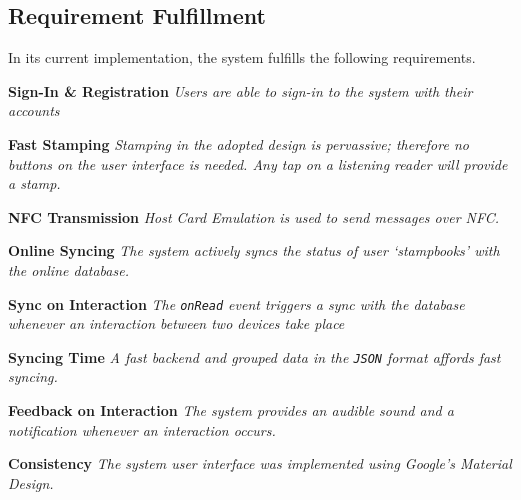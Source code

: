 \subsection{Requirement Fulfillment}
In its current implementation, the system fulfills the following requirements.
\begin{description}[leftmargin=!,labelwidth=\widthof{\bfseries Medium}]
    \item[M1] \textbf{Sign-In \& Registration} \newline
        \textit{Users are able to sign-in to the system with their accounts}
        
    \item[M2] \textbf{Fast Stamping} \newline
        \textit{Stamping in the adopted design is pervassive; therefore no buttons on the user interface is needed. Any tap on a listening reader will provide a stamp.}
    
    \item[M3] \textbf{NFC Transmission} \newline
        \textit{Host Card Emulation is used to send messages over NFC.}
        
    \item[M4] \textbf{Online Syncing} \newline
        \textit{The system actively syncs the status of user `stampbooks' with the online database.}
        
    \item[M5] \textbf{Sync on Interaction} \newline
        \textit{The \texttt{onRead} event triggers a sync with the database whenever an interaction between two devices take place}
        
    \item[M6] \textbf{Syncing Time} \newline
        \textit{A fast backend and grouped data in the \texttt{JSON} format affords fast syncing.}
        
    \item[M7] \textbf{Feedback on Interaction}
        \textit{The system provides an audible sound and a notification whenever an interaction occurs.}

    \item[S1] \textbf{Consistency} \newline
        \textit{The system user interface was implemented using Google's Material Design.}
        

\end{description}
